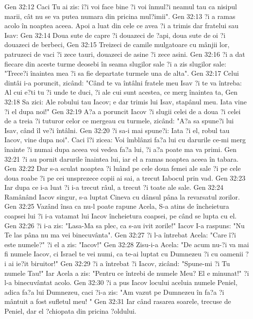 Gen 32:12  Caci Tu ai zis: î?i voi face bine ?i voi înmul?i neamul tau ca nisipul marii, cât nu se va putea numara din pricina mul?imii".
Gen 32:13  ?i a ramas acolo în noaptea aceea. Apoi a luat din cele ce avea ?i a trimis dar fratelui sau Isav:
Gen 32:14  Doua sute de capre ?i douazeci de ?api, doua sute de oi ?i douazeci de berbeci,
Gen 32:15  Treizeci de camile mulgatoare cu mânjii lor, patruzeci de vaci ?i zece tauri, douazeci de asine ?i zece asini.
Gen 32:16  ?i a dat fiecare din aceste turme deosebi în seama slugilor sale ?i a zis slugilor sale: "Trece?i înaintea mea ?i sa fie departate turmele una de alta".
Gen 32:17  Celui dintâi i-a poruncit, zicând: "Când te va întâlni fratele meu Isav ?i te va întreba: Al cui e?ti tu ?i unde te duci, ?i ale cui sunt acestea, ce merg înaintea ta,
Gen 32:18  Sa zici: Ale robului tau Iacov; e dar trimis lui Isav, stapânul meu. Iata vine ?i el dupa noi!"
Gen 32:19  A?a a poruncit Iacov ?i slugii celei de a doua ?i celei de a treia ?i tuturor celor ce mergeau cu turmele, zicând: "A?a sa spune?i lui Isav, când îl ve?i întâlni.
Gen 32:20  ?i sa-i mai spune?i: Iata ?i el, robul tau Iacov, vine dupa noi". Caci î?i zicea: Voi îmblânzi fa?a lui cu darurile ce-mi merg înainte ?i numai dupa aceea voi vedea fa?a lui, ?i a?a poate ma va primi.
Gen 32:21  ?i au pornit darurile înaintea lui, iar el a ramas noaptea aceea în tabara.
Gen 32:22  Dar s-a sculat noaptea ?i luând pe cele doua femei ale sale ?i pe cele doua roabe ?i pe cei unsprezece copii ai sai, a trecut Iabocul prin vad.
Gen 32:23  Iar dupa ce i-a luat ?i i-a trecut râul, a trecut ?i toate ale sale.
Gen 32:24  Ramânând Iacov singur, s-a luptat Cineva cu dânsul pâna la revarsatul zorilor.
Gen 32:25  Vazând însa ca nu-l poate rapune Acela, S-a atins de încheietura coapsei lui ?i i-a vatamat lui Iacov încheietura coapsei, pe când se lupta cu el.
Gen 32:26  ?i i-a zis: "Lasa-Ma sa plec, ca s-au ivit zorile!" Iacov I-a raspuns: "Nu Te las pâna nu ma vei binecuvânta".
Gen 32:27  ?i l-a întrebat Acela: "Care î?i este numele?" ?i el a zis: "Iacov!"
Gen 32:28  Zisu-i-a Acela: "De acum nu-?i va mai fi numele Iacov, ci Israel te vei numi, ca te-ai luptat cu Dumnezeu ?i cu oamenii ?i ai ie?it biruitor!"
Gen 32:29  ?i a întrebat ?i Iacov, zicând: "Spune-mi ?i Tu numele Tau!" Iar Acela a zis: "Pentru ce întrebi de numele Meu? El e minunat!" ?i l-a binecuvântat acolo.
Gen 32:30  ?i a pus Iacov locului aceluia numele Peniel, adica fa?a lui Dumnezeu, caci ?i-a zis: "Am vazut pe Dumnezeu în fa?a ?i mântuit a fost sufletul meu! "
Gen 32:31  Iar când rasarea soarele, trecuse de Peniel, dar el ?chiopata din pricina ?oldului.
